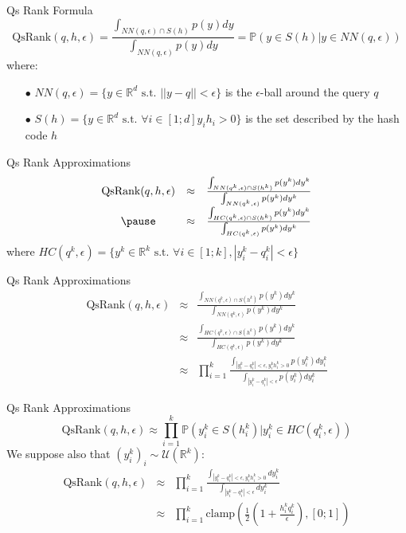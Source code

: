 \documentclass[english]{beamer}
\newcommand{\RR}{\mathbb{R}}
\newcommand{\qr}{\textrm{QsRank}}
\theoremstyle{plain}
\theoremstyle{remark}
\begin{document}
\begin{frame}{Qs Rank Formula}
\[
	\qr(q, h, \epsilon) = \frac{\int_{NN(q,\epsilon) \cap S(h)} p(y) dy}{\int_{NN(q,\epsilon)} p(y) dy} = \mathbb{P}(y \in S(h) | y\in NN(q,\epsilon))
\]
where:
\begin{enumerate}
	\item[$\bullet$]$NN(q,\epsilon) = \{y \in \RR^d \text{ s.t. } ||y-q||<\epsilon\}$ is the $\epsilon$-ball around the query $q$
	\item[$\bullet$]$S(h) = \{y \in \RR^d \text{ s.t. } \forall i \in [1;d] y_i h_i > 0 \}$ is the set described by the hash code $h$
\end{enumerate}
\end{frame}

\begin{frame}{Qs Rank Approximations}
\[
	\begin{array}{ccc}
	\qr(q, h, \epsilon) 
	& \approx & \frac{\int_{NN(q^k,\epsilon) \cap S(h^k)} p(y^k) dy^k}{\int_{NN(q^k,\epsilon)} p(y^k) dy^k}\\
	\pause
	& \approx & \frac{\int_{HC(q^k,\epsilon) \cap S(h^k)} p(y^k) dy^k}{\int_{HC(q^k,\epsilon)} p(y^k) dy^k}
	\end{array}
\]
where $HC(q^k,\epsilon) = \{y^k \in \RR^k \text{ s.t. } \forall i \in [1;k], |y^k_i-q^k_i|<\epsilon\}$
\end{frame}

\begin{frame}{Qs Rank Approximations}
\[
	\begin{array}{ccc}
	\qr(q, h, \epsilon) 
	& \approx & \frac{\int_{NN(q^k,\epsilon) \cap S(h^k)} p(y^k) dy^k}{\int_{NN(q^k,\epsilon)} p(y^k) dy^k}\\
	& \approx & \frac{\int_{HC(q^k,\epsilon) \cap S(h^k)} p(y^k) dy^k}{\int_{HC(q^k,\epsilon)} p(y^k) dy^k}\\
	& \approx & \prod_{i=1}^k \frac{\int_{|y^k_i - q^k_i| < \epsilon, y^k_i h^k_i > 0 } p(y^k_i) dy^k_i}{\int_{|y^k_i - q^k_i| < \epsilon} p(y^k_i) dy^k_i}
	\end{array}
\]
\end{frame}

\begin{frame}{Qs Rank Approximations}
\[
	\qr(q, h, \epsilon) \approx \prod_{i=1}^k \mathbb{P}(y^k_i \in S(h^k_i) | y^k_i \in HC(q^k_i,\epsilon))
\]
We suppose also that $(y_i^k)_i \sim \mathcal{U}(\RR^k)$:
\[
	\begin{array}{ccc}
	\qr(q, h, \epsilon) 
	& \approx & \prod_{i=1}^k \frac{\int_{|y^k_i - q^k_i| < \epsilon, y^k_i h^k_i > 0 } dy^k_i}{\int_{|y^k_i - q^k_i| < \epsilon} dy^k_i} \\
	& \approx & \prod_{i=1}^k \text{clamp} (\frac{1}{2}( 1 + \frac{h^k_i q^k_i}{\epsilon} ), [0;1] )                  
	\end{array}
\]
\end{frame}
\end{document}
